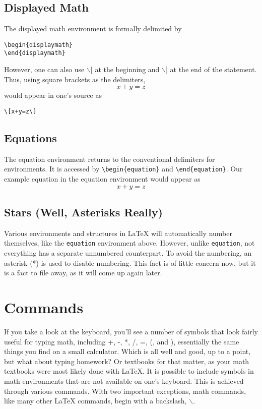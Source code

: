 \subsection{Displayed Math}
\label{sec:displayed-math}

The displayed math environment is formally delimited by
\begin{verbatim}
\begin{displaymath}
\end{displaymath}
\end{verbatim}
However, one can also use $\backslash [$ at the beginning and
$\backslash ]$ at the end of the statement.  Thus, using square
brackets as the delimiters, \[x+y=z\] would appear in one's source as
\begin{verbatim}
\[x+y=z\]
\end{verbatim}

\subsection{Equations}
\label{sec:equations}

The equation environment returns to the conventional delimiters for
environments.  It is accessed by \verb=\begin{equation}= and
\verb=\end{equation}=.  Our example equation in the equation
environment would appear as
\begin{equation}
  \label{eq:1}
  x+y=z
\end{equation}

\subsection{Stars (Well, Asterisks Really)}
\label{sec:stars-well-asterisks}

Various environments and structures in \LaTeX{} will automatically
number themselves, like the \texttt{equation} environment above.
However, unlike \texttt{equation}, not everything has a separate
unnumbered counterpart.  To avoid the numbering, an asterisk (*) is
used to disable numbering.  This fact is of little concern now, but it
is a fact to file away, as it will come up again later.

\section{Commands}
\label{sec:commands}

If you take a look at the keyboard, you'll see a number of symbols
that look fairly useful for typing math, including +, -, *, /, =, (,
and ), essentially the same things you find on a small calculator.
Which is all well and good, up to a point, but what about typing
homework?  Or textbooks for that matter, as your math textbooks were
most likely done with \LaTeX{}.  It is possible to include symbols in
math environments that are not available on one's keyboard.  This is
achieved through various commands.  With two important exceptions,
math commands, like many other \LaTeX{} commands, begin with a
backslash, $\backslash$.

